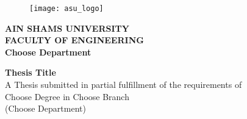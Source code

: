 \thispagestyle{empty} %

\begin{center}
	\begin{figure}
		\begin{center}
			\texttt{[image: asu\_logo]}
		\end{center}
	\end{figure}
	\small
	\textbf{AIN SHAMS UNIVERSITY\\
		FACULTY OF ENGINEERING\\
		Choose Department}
	
	
	
	\vfill
	\Large
	\textbf{Thesis Title} \\ 
	
	\vfill
	\small
	A Thesis submitted in partial fulfillment of the requirements of \\ 
	Choose Degree in Choose Branch  \\
	(Choose Department)\\
	
	
	
	
	
	
	

\end{center}
